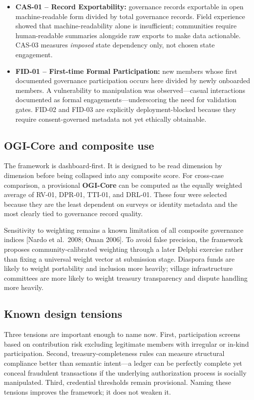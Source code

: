 \documentclass[sigconf,anonymous]{acmart}
\begin{document}
\begin{itemize}
\item \textbf{CAS-01 -- Record Exportability:} governance records exportable in open machine-readable form divided by total governance records. Field experience showed that machine-readability alone is insufficient; communities require human-readable summaries alongside raw exports to make data actionable. CAS-03 measures \emph{imposed} state dependency only, not chosen state engagement.
\item \textbf{FID-01 -- First-time Formal Participation:} new members whose first documented governance participation occurs here divided by newly onboarded members. A vulnerability to manipulation was observed---casual interactions documented as formal engagements---underscoring the need for validation gates. FID-02 and FID-03 are explicitly deployment-blocked because they require consent-governed metadata not yet ethically obtainable.
\end{itemize}

\subsection{OGI-Core and composite use}

The framework is dashboard-first. It is designed to be read dimension by dimension before being collapsed into any composite score. For cross-case comparison, a provisional \textbf{OGI-Core} can be computed as the equally weighted average of RV-01, DPR-01, TTI-01, and DRL-01. These four were selected because they are the least dependent on surveys or identity metadata and the most clearly tied to governance record quality.

Sensitivity to weighting remains a known limitation of all composite governance indices [Nardo et al.\ 2008; Oman 2006]. To avoid false precision, the framework proposes community-calibrated weighting through a later Delphi exercise rather than fixing a universal weight vector at submission stage. Diaspora funds are likely to weight portability and inclusion more heavily; village infrastructure committees are more likely to weight treasury transparency and dispute handling more heavily.

\subsection{Known design tensions}

Three tensions are important enough to name now. First, participation screens based on contribution risk excluding legitimate members with irregular or in-kind participation. Second, treasury-completeness rules can measure structural compliance better than semantic intent---a ledger can be perfectly complete yet conceal fraudulent transactions if the underlying authorization process is socially manipulated. Third, credential thresholds remain provisional. Naming these tensions improves the framework; it does not weaken it.
\end{document}
